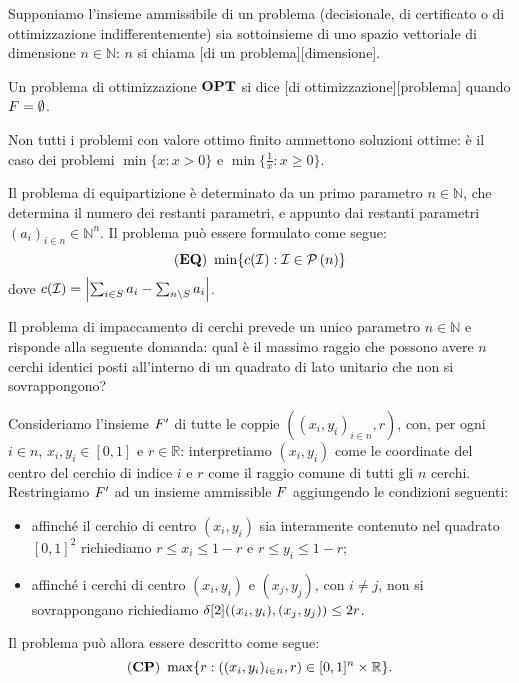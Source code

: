 \begin{Definition}
	Supponiamo l'insieme ammissibile di un problema (decisionale, di certificato o di ottimizzazione indifferentemente) sia sottoinsieme di uno spazio vettoriale di dimensione $n \in \mathbb{N}$: $n$ si chiama [di un problema][dimensione].
\end{Definition}
\begin{Definition}
	Un problema di ottimizzazione $\textbf{OPT}$ si dice [di ottimizzazione][problema] quando $F = \emptyset$.
\end{Definition}
\begin{Example}
	Non tutti i problemi con valore ottimo finito ammettono soluzioni ottime: \`e il caso dei problemi $\min \lbrace x: x > 0 \rbrace$ e $\min \lbrace \frac{1}{x}: x \geq 0 \rbrace$.
\end{Example}
\begin{Example}
	 Il problema di
	equipartizione \`e determinato da un primo parametro
	$n \in \mathbb{N}$, che determina il numero dei
	restanti parametri, e appunto dai restanti parametri
	$(a_i)_{i \in n} \in \mathbb{N}^n$. Il problema pu\`o
	essere formulato come segue:
	$$(\textbf{EQ})\ \min \lbrace c(\mathcal{I}): \mathcal{I} \in \mathcal{P} \left (n \right ) \rbrace$$
	dove $c(\mathcal{I}) = \left \lvert \sum_{i \in S} a_i - \sum_{n \setminus S} a_i \right \rvert$.
\end{Example}
\begin{Example}
	Il problema di impaccamento di cerchi prevede un unico parametro
	$n \in \mathbb{N}$ e risponde alla seguente domanda: qual \`e il
	massimo raggio che possono avere $n$ cerchi identici posti
	all'interno di un quadrato di lato unitario che non si
	sovrappongono?
	\par Consideriamo l'insieme $F'$ di tutte le coppie
	$((x_i,y_i)_{i \in n}, r)$, con, per ogni $i \in n$, $x_i, y_i \in
	[0,1]$ e $r \in \mathbb{R}$: interpretiamo $(x_i, y_i)$ come le
	coordinate del centro del cerchio di indice $i$ e $r$ come il
	raggio comune di tutti gli $n$ cerchi. Restringiamo
	$F'$ ad un insieme ammissible $F$
	aggiungendo le condizioni seguenti:
	\begin{itemize}
		\item affinch\'e il cerchio di centro $(x_i,y_i)$ sia
		interamente contenuto nel quadrato $[0,1]^2$ richiediamo
		$r \leq x_i \leq 1 - r$ e $r \leq y_i \leq 1 - r$;
		\item affinch\'e i cerchi di centro $(x_i,y_i)$ e
		$(x_j,y_j)$, con $i \neq j$, non si sovrappongano
		richiediamo
		$\delta[2]((x_i,y_i),(x_j,y_j)) \leq 2r$.
	\end{itemize}
	Il problema pu\`o allora essere descritto come segue:
	$$(\textbf{CP})\ \max \lbrace r: ((x_i,y_i)_{i \in n}, r) \in [0,1]^n \times \mathbb{R} \rbrace.$$
\end{Example}

